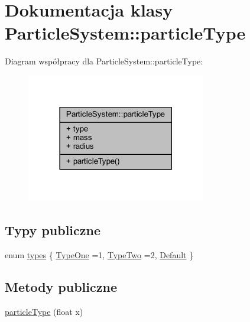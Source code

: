 \hypertarget{class_particle_system_1_1particle_type}{\section{Dokumentacja klasy Particle\-System\-:\-:particle\-Type}
\label{class_particle_system_1_1particle_type}
}


Diagram współpracy dla Particle\-System\-:\-:particle\-Type\-:\nopagebreak
\begin{figure}[H]
\begin{center}
\leavevmode
\includegraphics[width=222pt]{class_particle_system_1_1particle_type__coll__graph}
\end{center}
\end{figure}
\subsection*{Typy publiczne}
\begin{DoxyCompactItemize}
\item 
enum \hyperlink{class_particle_system_1_1particle_type_a41677c7a6376be429aae198a3d6d0dcf}{types} \{ \hyperlink{class_particle_system_1_1particle_type_a41677c7a6376be429aae198a3d6d0dcfabf31550fb1eca476d61467c6e2f37e4a}{Type\-One} =1, 
\hyperlink{class_particle_system_1_1particle_type_a41677c7a6376be429aae198a3d6d0dcfa62eb1dd5282cb0f225ab2a1de3df820d}{Type\-Two} =2, 
\hyperlink{class_particle_system_1_1particle_type_a41677c7a6376be429aae198a3d6d0dcfa2a1a0e456096ddefcfd80d6dea0164f5}{Default}
 \}
\end{DoxyCompactItemize}
\subsection*{Metody publiczne}
\begin{DoxyCompactItemize}
\item 
\hyperlink{class_particle_system_1_1particle_type_a12bff78b90f86f1d8b3f26958aef6152}{particle\-Type} (float x)
\end{DoxyCompactItemize}
